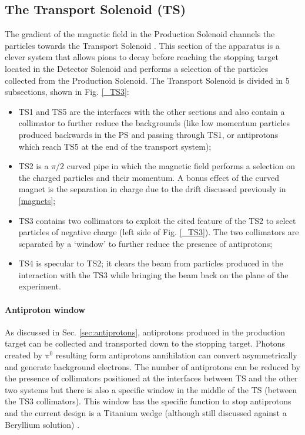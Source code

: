 \documentclass[12pt,a4paper,openright, oneside, titlepage]{book} %
\begin{document}
\subsection{The Transport Solenoid (TS)}
The gradient of the magnetic field in the Production Solenoid channels the particles towards the Transport Solenoid \cite{TS}. 
This section of the apparatus is a clever system that allows pions to decay before reaching the stopping target 
located in the Detector Solenoid
and performs a selection of the particles collected from the Production Solenoid. 
The Transport Solenoid is divided in 5 subsections, shown in Fig. \ref{_TS3}:
\begin{itemize}
\item TS1 and TS5 are the interfaces with the other sections and also contain a collimator to further reduce the backgrounds (like low momentum particles produced backwards in the PS and passing through TS1, or antiprotons which reach TS5 at the end of the transport system);
\item TS2 is a $\pi/2$ curved pipe in which the magnetic field performs a selection on the charged particles and their momentum. A bonus effect of the curved magnet is the separation in charge due to the drift discussed previously in \ref{magnets}; 
\item TS3 contains two collimators to exploit the cited feature of the TS2 to select particles of negative charge (left side of Fig. \ref{_TS3}). 
The two collimators are separated by a `window' to further reduce the presence of antiprotons;
\item TS4 is specular to TS2; it clears the beam from particles produced in the interaction with the TS3 while bringing the beam back on the plane of the experiment.
\end{itemize}

\paragraph{Antiproton window} As discussed in Sec. \ref{sec:antiprotons}, antiprotons produced in the production target can be collected and transported down to the stopping target. 
Photons created by $\pi^0$ resulting form antiprotons annihilation can convert asymmetrically and generate background electrons. 
The number of antiprotons can be reduced by the presence of collimators positioned at the interfaces between TS and the other two systems but there is also a specific window in the middle of the TS (between the TS3 collimators). 
This window has the specific function to stop antiprotons and the current design is a Titanium wedge (although still discussed against a Beryllium solution) \cite{PbarWindow}.
\end{document}
